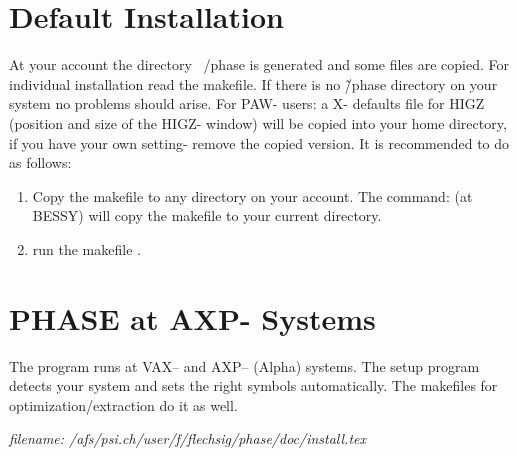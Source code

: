 \section{Default Installation}
At your account the directory ~/phase is generated and some files are copied.
For individual installation read the makefile. If there is no \~/phase directory
on your system no problems should arise. For PAW- users: a X- defaults file for
HIGZ (position and size of the HIGZ- window) will 
be copied into your home directory, if you have your own setting- remove the
copied version. 
It is recommended to do as follows:
\begin{enumerate}         
   \item Copy the makefile to any directory on your account. The command:  
   (at BESSY)  will copy the makefile
   to your current directory. 
  \item run the makefile  .
\end{enumerate}



\section{PHASE at AXP- Systems}
The \phase program runs at VAX-- and AXP-- (Alpha) systems. The  setup
program  detects your system and sets the right symbols
automatically. The makefiles for optimization/extraction do it as well.

\tiny{\it filename: /afs/psi.ch/user/f/flechsig/phase/doc/install.tex}  
